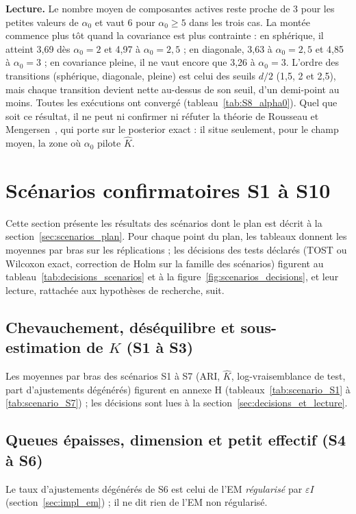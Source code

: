 \textbf{Lecture. }Le nombre moyen de composantes actives reste proche de 3 pour les petites valeurs de $\alpha_0$ et vaut 6 pour $\alpha_0 \geq 5$ dans les trois cas. La montée commence plus tôt quand la covariance est plus contrainte : en sphérique, il atteint 3,69 dès $\alpha_0 = 2$ et 4,97 à $\alpha_0 = 2{,}5$ ; en diagonale, 3,63 à $\alpha_0 = 2{,}5$ et 4,85 à $\alpha_0 = 3$ ; en covariance pleine, il ne vaut encore que 3,26 à $\alpha_0 = 3$. L'ordre des transitions (sphérique, diagonale, pleine) est celui des seuils $d/2$ (1,5, 2 et 2,5), mais chaque transition devient nette au-dessus de son seuil, d'un demi-point au moins. Toutes les exécutions ont convergé (tableau~\ref{tab:S8_alpha0}). Quel que soit ce résultat, il ne peut ni confirmer ni réfuter la théorie de Rousseau et Mengersen~\cite{rousseau2011}, qui porte sur le posterior exact : il situe seulement, pour le champ moyen, la zone où $\alpha_0$ pilote $\hat K$.

\section{Scénarios confirmatoires S1 à S10}\label{sec:res_scenarios}
Cette section présente les résultats des scénarios dont le plan est décrit à la section~\ref{sec:scenarios_plan}. Pour chaque point du plan, les tableaux donnent les moyennes par bras sur les réplications ; les décisions des tests déclarés (TOST ou Wilcoxon exact, correction de Holm sur la famille des scénarios) figurent au tableau~\ref{tab:decisions_scenarios} et à la figure~\ref{fig:scenarios_decisions}, et leur lecture, rattachée aux hypothèses de recherche, suit.

\subsection{Chevauchement, déséquilibre et sous-estimation de $K$ (S1 à S3)}\label{sec:res_s1s3}
Les moyennes par bras des scénarios S1 à S7 (ARI, $\hat K$, log-vraisemblance de test, part d'ajustements dégénérés) figurent en annexe H (tableaux~\ref{tab:scenario_S1} à \ref{tab:scenario_S7}) ; les décisions sont lues à la section~\ref{sec:decisions_et_lecture}.

\subsection{Queues épaisses, dimension et petit effectif (S4 à S6)}\label{sec:res_s4s6}
Le taux d'ajustements dégénérés de S6 est celui de l'EM \emph{régularisé} par $\varepsilon I$ (section~\ref{sec:impl_em}) ; il ne dit rien de l'EM non régularisé.

